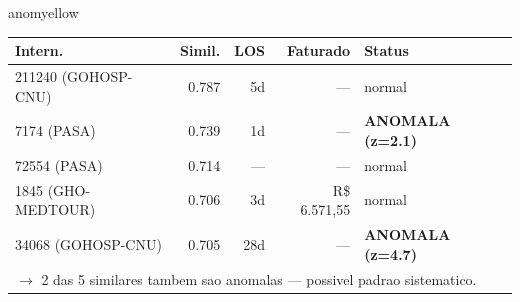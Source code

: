 \documentclass[a4paper,10pt]{article}
\begin{document}
\begin{anomalycard}[Internacao 160888 | GHO-PETROBRAS | MODERADO (z=2.54)]{anomyellow}
\begin{tabular}{l r r r l}\toprule\textbf{Intern.} & \textbf{Simil.} & \textbf{LOS} & \textbf{Faturado} & \textbf{Status} \\\midrule
211240 (GOHOSP-CNU) & 0.787 & 5d & --- & \textcolor{jcubeblue}{normal} \\
7174 (PASA) & 0.739 & 1d & --- & \textcolor{anomred}{\textbf{ANOMALA (z=2.1)}} \\
72554 (PASA) & 0.714 & --- & --- & \textcolor{jcubeblue}{normal} \\
1845 (GHO-MEDTOUR) & 0.706 & 3d & R\$ 6.571,55 & \textcolor{jcubeblue}{normal} \\
34068 (GOHOSP-CNU) & 0.705 & 28d & --- & \textcolor{anomred}{\textbf{ANOMALA (z=4.7)}} \\
\multicolumn{5}{l}{\textcolor{anomred}{\small $\rightarrow$ 2 das 5 similares tambem sao anomalas --- possivel padrao sistematico.}} \\
\bottomrule\end{tabular}


\end{anomalycard}

\newpage
\end{document}
